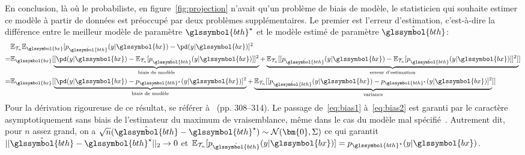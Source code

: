 En conclusion, là où le probabiliste, en figure~\ref{fig:projection} n'avait qu'un problème de biais de modèle, le statisticien qui souhaite estimer ce modèle à partir de données est préoccupé par deux problèmes supplémentaires. Le premier est l'erreur d'estimation, c'est-à-dire la différence entre le meilleur modèle de paramètre $\glssymbol{bth}^\star$ et le modèle estimé de paramètre $\hat{\glssymbol{bth}}$:
\begin{align}
 & \mathbb{E}_{\mathcal{T}_n} \mathbb{E}_{\glssymbol{bx}} [p_{\hat{\glssymbol{bth}}}(y| \glssymbol{bx}) - \pd(y| \glssymbol{bx})]^2  \nonumber \\
= & \mathbb{E}_{\glssymbol{bx}} [ \underbrace{[\pd(y| \glssymbol{bx}) - \mathbb{E}_{\mathcal{T}_n} [ p_{\hat{\glssymbol{bth}}}(y| \glssymbol{bx})]]^2}_{\text{biais de modèle}} + \underbrace{\mathbb{E}_{\mathcal{T}_n} [[ p_{\hat{\glssymbol{bth}}}(y| \glssymbol{bx}) - \mathbb{E}_{\mathcal{T}_n} [ p_{\hat{\glssymbol{bth}}}(y| \glssymbol{bx}) ]]^2]}_{\text{erreur d'estimation}} ] \label{eq:bias1} \\
= & \mathbb{E}_{\glssymbol{bx}} [ \underbrace{[\pd(y| \glssymbol{bx}) - p_{\glssymbol{bth}^\star}(y| \glssymbol{bx})]^2}_{\text{biais de modèle}} + \underbrace{\mathbb{E}_{\mathcal{T}_n} [[ p_{\hat{\glssymbol{bth}}}(y| \glssymbol{bx}) - p_{\glssymbol{bth}^\star}(y| \glssymbol{bx})  ]^2}_{\text{variance}} ]] \label{eq:bias2}
\end{align}
Pour la dérivation rigoureuse de ce résultat, se référer à~\cite{schutze2008introduction} (pp. 308–314). Le passage de~\ref{eq:bias1} à~\ref{eq:bias2} est garanti par le caractère asymptotiquement sans biais de l'estimateur du maximum de vraisemblance, même dans le cas du modèle mal spécifié~\cite{white1982maximum}. Autrement dit, pour $n$ assez grand, on a $\sqrt{n} (\hat{\glssymbol{bth}} - \glssymbol{bth}^\star) \sim \mathcal{N}(\bm{0} , \Sigma)$ ce qui garantit $|| \hat{\glssymbol{bth}} - \glssymbol{bth}^\star||_2 \to 0$ et $\mathbb{E}_{\mathcal{T}_n} [ p_{\hat{\glssymbol{bth}}}(y| \glssymbol{bx})] = p_{\glssymbol{bth}^\star}(y| \glssymbol{bx})$.
